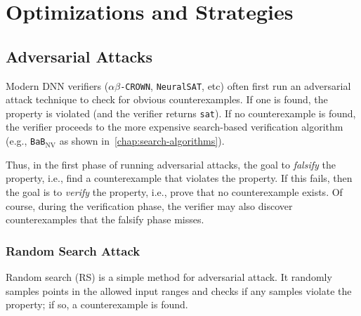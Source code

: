 \documentclass[oneside,11pt,dvipsnames]{book}
\numberwithin{equation}{section}
\theoremstyle{definition}
\theoremstyle{remark}
\newcommand{\crown}{\texttt{$\alpha\beta$-CROWN}}
\newcommand{\bab}{\texttt{BaB$_{\text{NV}}$}}
\newcommand{\neuralsat}{\texttt{NeuralSAT}}
\newcommand{\sat}{\texttt{sat}}
\begin{document}
\part{Optimizations and Strategies}\label{part:optimizations}

\chapter{Adversarial Attacks}\label{chap:adversarial-attacks}

Modern DNN verifiers (\crown{}, \neuralsat{}, etc) often first run an adversarial attack technique to check for obvious counterexamples. If one is found, the property is violated (and the verifier returns \sat). If no counterexample is found, the verifier proceeds to the more expensive search-based verification algorithm (e.g., \bab{} as shown in~\autoref{chap:search-algorithms}).

Thus, in the first phase of running adversarial attacks, the goal to \emph{falsify} the property, i.e., find a counterexample that violates the property. If this fails, then the goal is to \emph{verify} the property, i.e., prove that no counterexample exists. Of course, during the verification phase, the verifier may also discover counterexamples that the falsify phase misses.

\section{Random Search Attack}
Random search (RS) is a simple method for adversarial attack.  It randomly samples points in the allowed input ranges and checks if any samples violate the property; if so, a counterexample is found.
\end{document}
